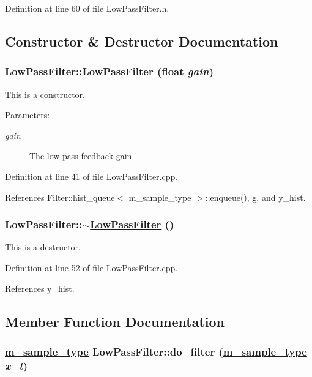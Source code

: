 Definition at line 60 of file Low\-Pass\-Filter.h.

\subsection{Constructor \& Destructor Documentation}
\hypertarget{classLowPassFilter_a0}{
\subsubsection[LowPassFilter]{\setlength{\rightskip}{0pt plus 5cm}Low\-Pass\-Filter::Low\-Pass\-Filter (float {\em gain})}}
\label{classLowPassFilter_a0}


This is a constructor. \begin{Desc}
\item[Parameters:]
\begin{description}
\item[{\em gain}]The low-pass feedback gain \end{description}
\end{Desc}


Definition at line 41 of file Low\-Pass\-Filter.cpp.

References Filter::hist\_\-queue$<$ m\_\-sample\_\-type $>$::enqueue(), g, and y\_\-hist.\hypertarget{classLowPassFilter_a1}{
\subsubsection[$\sim$LowPassFilter]{\setlength{\rightskip}{0pt plus 5cm}Low\-Pass\-Filter::$\sim$\hyperlink{classLowPassFilter}{Low\-Pass\-Filter} ()}}
\label{classLowPassFilter_a1}


This is a destructor. 

Definition at line 52 of file Low\-Pass\-Filter.cpp.

References y\_\-hist.

\subsection{Member Function Documentation}
\hypertarget{classLowPassFilter_a2}{
\subsubsection[do\_\-filter]{\setlength{\rightskip}{0pt plus 5cm}\hyperlink{Types_8h_a0}{m\_\-sample\_\-type} Low\-Pass\-Filter::do\_\-filter (\hyperlink{Types_8h_a0}{m\_\-sample\_\-type} {\em x\_\-t})}}
\label{classLowPassFilter_a2}


